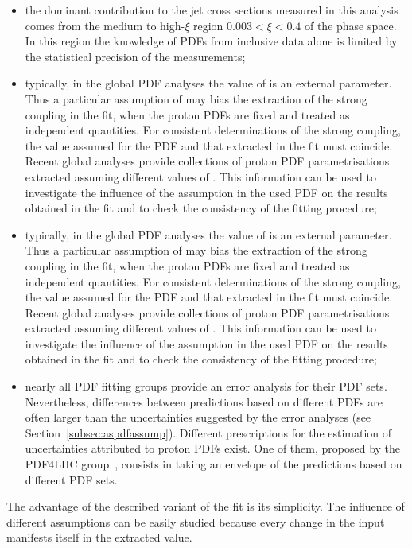 \begin{itemize}
 \item the dominant contribution to the jet cross sections measured in this analysis comes from the medium to high-$\xi$ region $0.003<\xi<0.4$ of the phase space. In this region the knowledge of PDFs from \hera inclusive data alone is limited by the statistical precision of the measurements;
 \item typically, in the global PDF analyses the value of \asz is an external parameter. Thus a particular assumption of \asz may bias the extraction of the strong coupling in the \as fit, when the proton PDFs are fixed and treated as independent quantities. For consistent determinations of the strong coupling, the value assumed for the PDF and that extracted in the fit must coincide. Recent global analyses provide collections of proton PDF parametrisations extracted assuming different values of \asz. This information can be used to investigate the influence of the \asz assumption in the used PDF on the \as results obtained in the fit and to check the consistency of the fitting procedure;
 \item typically, in the global PDF analyses the value of \asz is an external parameter. Thus a particular assumption of \asz may bias the extraction of the strong coupling in the \as fit, when the proton PDFs are fixed and treated as independent quantities. For consistent determinations of the strong coupling, the value assumed for the PDF and that extracted in the fit must coincide. Recent global analyses provide collections of proton PDF parametrisations extracted assuming different values of \asz. This information can be used to investigate the influence of the \asz assumption in the used PDF on the \as results obtained in the fit and to check the consistency of the fitting procedure;
 \item nearly all PDF fitting groups provide an error analysis for their PDF sets. Nevertheless, differences between predictions based on different PDFs are often larger than the uncertainties suggested by the error analyses (see Section~\ref{subsec:aspdfassump}). Different prescriptions for the estimation of uncertainties attributed to proton PDFs exist. One of them, proposed by the PDF4LHC group~\cite{pdf4lhc:2011}, consists in taking an envelope of the predictions based on different PDF sets. %
\end{itemize}

The advantage of the described variant of the fit is its simplicity. The influence of different assumptions can be easily studied because every change in the input manifests itself in the extracted \asz value. 

